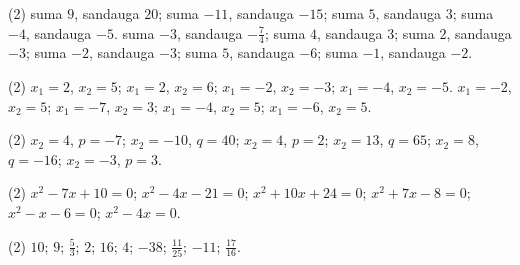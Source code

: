 \documentclass[11pt,a4paper]{scrartcl}
\begin{document}
\newpage
\answerssection

\begin{problem} \phantom{text}
\begin{tasks}[label={(\arabic*)}, label-offset=0.9em](2)
    \task suma $9$, sandauga $20$;
    \task suma $-11$, sandauga $-15$;
    \task suma $5$, sandauga $3$;
    \task suma $-4$, sandauga $-5$.
    \task suma $-3$, sandauga $-\frac{7}{4}$;
    \task suma $4$, sandauga $3$;
    \task suma $2$, sandauga $-3$;
    \task suma $-2$, sandauga $-3$;
    \task suma $5$, sandauga $-6$;
    \task suma $-1$, sandauga $-2$.
\end{tasks}
\end{problem}

\begin{problem} \phantom{text}
\begin{tasks}[label={(\arabic*)}, label-offset=0.9em](2)
    \task $x_1 = 2$, $x_2 = 5$;
    \task $x_1 = 2$, $x_2 = 6$;
    \task $x_1 = -2$, $x_2 = -3$;
    \task $x_1 = -4$, $x_2 = -5$.
    \task $x_1 = -2$, $x_2 = 5$;
    \task $x_1 = -7$, $x_2 = 3$;
    \task $x_1 = -4$, $x_2 = 5$;
    \task $x_1 = -6$, $x_2 = 5$.
\end{tasks}
\end{problem}

\begin{problem} \phantom{text}
\begin{tasks}[label={(\arabic*)}, label-offset=0.9em](2)
    \task $x_2 = 4$, $p = -7$;
    \task $x_2 = -10$, $q = 40$;
    \task $x_2 = 4$, $p = 2$;
    \task $x_2 = 13$, $q = 65$;
    \task $x_2 = 8$, $q = -16$;
    \task $x_2 = -3$, $p = 3$.
\end{tasks}
\end{problem}

\begin{problem} \phantom{text}
\begin{tasks}[label={(\arabic*)}, label-offset=0.9em](2)
    \task $x^2 - 7x + 10 = 0$;
    \task $x^2 - 4x - 21 = 0$;
    \task $x^2 + 10x + 24 = 0$;
    \task $x^2 + 7x - 8 = 0$;
    \task $x^2 - x - 6 = 0$;
    \task $x^2 - 4x = 0$.
\end{tasks}
\end{problem}

\begin{problem} \phantom{text}
\begin{tasks}[label={(\arabic*)}, label-offset=0.9em](2)
    \task $10$;
    \task $9$;
    \task $\frac{5}{3}$;
    \task $2$;
    \task $16$;
    \task $4$;
    \task $-38$;
    \task $\frac{11}{25}$;
    \task $-11$;
    \task $\frac{17}{16}$.
\end{tasks}
\end{problem}
\end{document}

